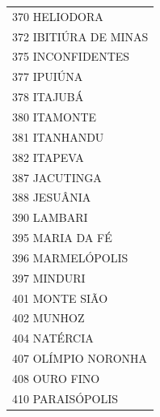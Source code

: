 \documentclass{article}
\begin{document}
\begin{longtable}[c]{m{18cm}}
\multicolumn{1}{l}{ \hspace{2em} 370 HELIODORA } \\
\multicolumn{1}{l}{ \hspace{2em} 372 IBITIÚRA DE MINAS } \\
\multicolumn{1}{l}{ \hspace{2em} 375 INCONFIDENTES } \\
\multicolumn{1}{l}{ \hspace{2em} 377 IPUIÚNA } \\
\multicolumn{1}{l}{ \hspace{2em} 378 ITAJUBÁ } \\
\multicolumn{1}{l}{ \hspace{2em} 380 ITAMONTE } \\
\multicolumn{1}{l}{ \hspace{2em} 381 ITANHANDU } \\
\multicolumn{1}{l}{ \hspace{2em} 382 ITAPEVA } \\
\multicolumn{1}{l}{ \hspace{2em} 387 JACUTINGA } \\
\multicolumn{1}{l}{ \hspace{2em} 388 JESUÂNIA } \\
\multicolumn{1}{l}{ \hspace{2em} 390 LAMBARI } \\
\multicolumn{1}{l}{ \hspace{2em} 395 MARIA DA FÉ } \\
\multicolumn{1}{l}{ \hspace{2em} 396 MARMELÓPOLIS } \\
\multicolumn{1}{l}{ \hspace{2em} 397 MINDURI } \\
\multicolumn{1}{l}{ \hspace{2em} 401 MONTE SIÃO } \\
\multicolumn{1}{l}{ \hspace{2em} 402 MUNHOZ } \\
\multicolumn{1}{l}{ \hspace{2em} 404 NATÉRCIA } \\
\multicolumn{1}{l}{ \hspace{2em} 407 OLÍMPIO NORONHA } \\
\multicolumn{1}{l}{ \hspace{2em} 408 OURO FINO } \\
\multicolumn{1}{l}{ \hspace{2em} 410 PARAISÓPOLIS } \\

\end{longtable}
\end{document}

